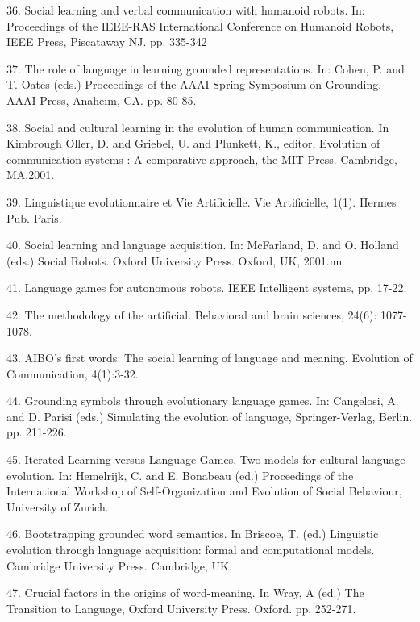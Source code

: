 36. \citet{Steels:01a} Social learning and verbal communication with humanoid robots. In: Proceedings of the IEEE-RAS International Conference on Humanoid Robots, IEEE Press, Piscataway NJ. pp. 335-342

37. \citet{Steels:01b} The role of language in learning grounded representations. In: Cohen, P. and T. Oates (eds.) Proceedings of the AAAI Spring Symposium on Grounding. AAAI Press, Anaheim, CA. pp. 80-85. 

38. \citet{Steels:01c} Social and cultural learning in the evolution of human communication. In Kimbrough Oller, D. and Griebel, U. and Plunkett, K., editor, Evolution of communication systems : A comparative approach, the MIT Press. Cambridge, MA,2001.

39. \citet{Steels:01d} Linguistique evolutionnaire et Vie Artificielle. Vie Artificielle, 1(1). Hermes Pub. Paris. 

40. \citet{Steels:01e} Social learning and language acquisition. In: McFarland, D. and  O. Holland (eds.) Social Robots. 
Oxford University Press. Oxford, UK, 2001.nn

41. \citet{Steels:01f} Language games for autonomous robots. IEEE Intelligent systems, pp. 17-22. 

42. \citet{Steels:01g} The methodology of the artificial. Behavioral and brain sciences, 24(6): 1077-1078. 

43. \citet{Steels:01h} AIBO's first words: The social learning of language and meaning. 
Evolution of Communication, 4(1):3-32. 

44. \citet{Steels:02b} Grounding symbols through evolutionary language games. In: Cangelosi, A. and D. Parisi (eds.) 
Simulating the evolution of language, Springer-Verlag, Berlin. pp. 211-226. 

45. \citet{Steels:02c} Iterated Learning versus Language Games. Two models for cultural language evolution. In: Hemelrijk, C. and 
E. Bonabeau (ed.) Proceedings of the International Workshop of Self-Organization and Evolution of 
Social Behaviour, University of Zurich. 

46. \citet{Steels:02d} Bootstrapping grounded word semantics. In Briscoe, T. (ed.) Linguistic evolution through 
language acquisition: formal and computational models. Cambridge University Press. Cambridge, UK. 

47. \citet{Steels:02e} Crucial factors in the origins of word-meaning. In Wray, A (ed.)
The Transition to Language, Oxford University Press. Oxford. pp. 252-271.  

